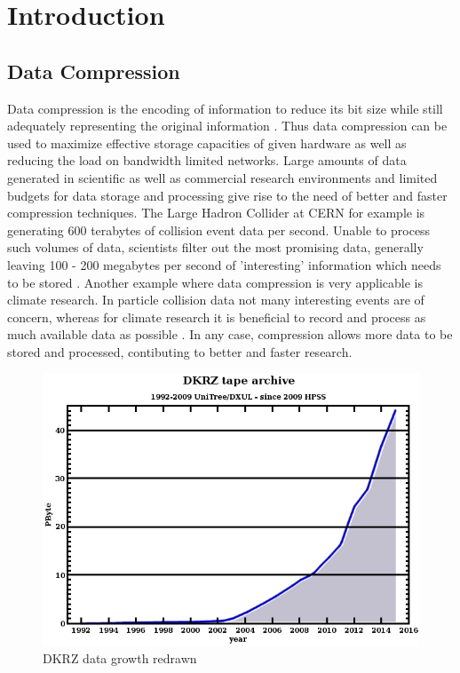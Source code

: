 \documentclass[
	12pt,
	a4paper,
	BCOR10mm,
	DIV14,
	headsepline,
]{scrreprt}
\begin{document}
\tableofcontents

\chapter{Introduction}
\label{Introduction}

\section{Data Compression}

\bigskip

Data compression is the encoding of information to reduce its bit size while
still adequately representing the original information \cite{wiki:dc}.
Thus data compression can be used to maximize effective storage capacities of
given hardware as well as reducing the load on bandwidth limited networks.
Large amounts of data generated in scientific as well as commercial research
environments and limited budgets for data storage and processing give rise to
the need of better and faster compression techniques. The Large Hadron Collider
at CERN for example is generating 600 terabytes of collision event data per
second. Unable to process such volumes of data, scientists filter out the most
promising data, generally leaving 100 - 200 megabytes per second of 'interesting'
information which needs to be stored \cite{cern_data}. Another example where
data compression is very applicable is climate research. In particle collision
data not many interesting events are of concern, whereas for climate research it is
beneficial to record and process as much available data as possible
\cite{clim_data}. In any case, compression allows more data to be stored and
processed, contibuting to better and faster research.

\begin{figure}
	\includegraphics[width=0.9\linewidth]{DKRZ_data_growth.png}
	\caption{DKRZ data growth redrawn\\ \cite{data_graph}}
	\label{fig:dkrz}
\end{figure}
\end{document}
